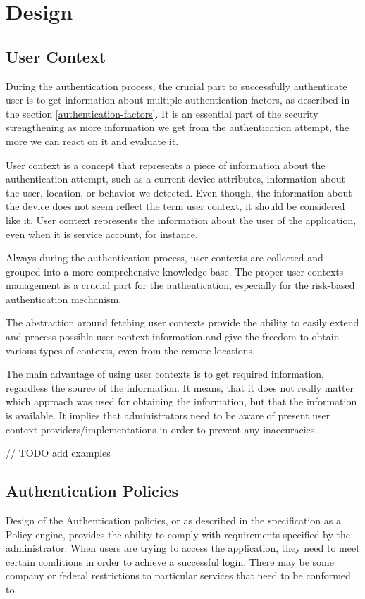 \chapter{Design}

\section{User Context}
During the authentication process, the crucial part to successfully authenticate user is to get information about multiple authentication factors, as described in the section \ref{authentication-factors}.
It is an essential part of the security strengthening as more information we get from the authentication attempt, the more we can react on it and evaluate it.

User context is a concept that represents a piece of information about the authentication attempt, such as a current device attributes, information about the user, location, or behavior we detected.
Even though, the information about the device does not seem reflect the term user context, it should be considered like it.
User context represents the information about the user of the application, even when it is service account, for instance.

Always during the authentication process, user contexts are collected and grouped into a more comprehensive knowledge base.
The proper user contexts management is a crucial part for the authentication, especially for the risk-based authentication mechanism.

The abstraction around fetching user contexts provide the ability to easily extend and process possible user context information and give the freedom to obtain various types of contexts, even from the remote locations.

The main advantage of using user contexts is to get required information, regardless the source of the information.
It means, that it does not really matter which approach was used for obtaining the information, but that the information is available.
It implies that administrators need to be aware of present user context providers/implementations in order to prevent any inaccuracies.

// TODO add examples


\section{Authentication Policies}
Design of the Authentication policies, or as described in the specification as a Policy engine, provides the ability to comply with requirements specified by the administrator.
When users are trying to access the application, they need to meet certain conditions in order to achieve a successful login.
There may be some company or federal restrictions to particular services that need to be conformed to.

